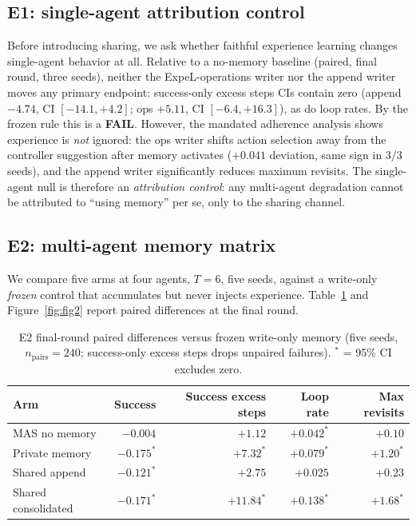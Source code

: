 \documentclass[11pt]{article}
\begin{document}
\subsection{E1: single-agent attribution control}

Before introducing sharing, we ask whether faithful experience learning changes single-agent
behavior at all. Relative to a no-memory baseline (paired, final round, three seeds), neither the
ExpeL-operations writer nor the append writer moves any primary endpoint: success-only excess
steps CIs contain zero (append $-4.74$, CI $[-14.1, +4.2]$; ops $+5.11$, CI $[-6.4, +16.3]$), as
do loop rates. By the frozen rule this is a \textbf{FAIL}. However, the mandated adherence
analysis shows experience is \emph{not} ignored: the ops writer shifts action selection away from
the controller suggestion after memory activates ($+0.041$ deviation, same sign in $3/3$ seeds),
and the append writer significantly reduces maximum revisits. The single-agent null is therefore
an \emph{attribution control}: any multi-agent degradation cannot be attributed to ``using
memory'' per se, only to the sharing channel.

\subsection{E2: multi-agent memory matrix}

We compare five arms at four agents, $T=6$, five seeds, against a write-only \emph{frozen}
control that accumulates but never injects experience. Table~\ref{tab:e2} and
Figure~\ref{fig:fig2} report paired differences at the final round.

\begin{table}[h]
\centering
\caption{E2 final-round paired differences versus frozen write-only memory (five seeds,
$n_{\text{pairs}}=240$; success-only excess steps drops unpaired failures).
$^\ast$ = 95\% CI excludes zero.}
\label{tab:e2}
\begin{tabular}{lrrrr}
\toprule
Arm & Success & Success excess steps & Loop rate & Max revisits \\
\midrule
MAS no memory      & $-0.004$          & $+1.12$            & $+0.042^\ast$ & $+0.10$ \\
Private memory     & $-0.175^\ast$     & $+7.32^\ast$       & $+0.079^\ast$ & $+1.20^\ast$ \\
Shared append      & $-0.121^\ast$     & $+2.75$            & $+0.025$      & $+0.23$ \\
Shared consolidated& $-0.171^\ast$     & $+11.84^\ast$      & $+0.138^\ast$ & $+1.68^\ast$ \\
\bottomrule
\end{tabular}
\end{table}
\end{document}
